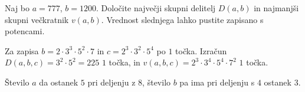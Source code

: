 \documentclass[addpoints,12pt]{exam}
\begin{document}
\begin{questions}


    \question[4]
    Naj bo $a=777$, $b=1200$. 
    Določite največji skupni delitelj $D(a,b)$ in najmanjši skupni večkratnik $v(a,b)$. Vrednost slednjega lahko pustite zapisano s potencami.

    \begin{solution}
        Za zapisa $b=2\cdot 3^3\cdot 5^2\cdot 7$ in $c=2^3\cdot 3^2\cdot 5^4$ po $1$ točka. 
        Izračun $D(a,b,c)=3^2\cdot 5^2=225$ $1$ točka, in $v(a,b,c)=2^3\cdot 3^4\cdot 5^4\cdot 7^2$ $1$ točka.
    \end{solution}
    
    
    \question
    Število $a$ da ostanek $5$ pri deljenju z $8$, število $b$ pa ima pri deljenju s $4$ ostanek $3$.





    



\end{questions}
\end{document}
